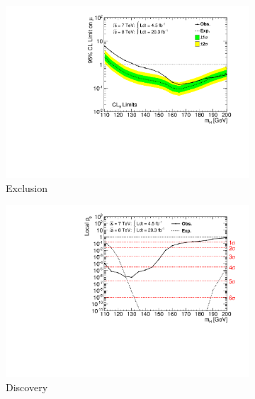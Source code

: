 \begin{figure}[p]
	\begin{subfigure}[b]{0.495\textwidth}
		\centering
		\includegraphics[width=\textwidth,clip=true,trim=0.6cm 0.8cm 1.0cm 0.4cm]{custom_images/limits/cls_ggf_only}
		\caption{Exclusion}
		\label{fig:ggf_results:CLs}
	\end{subfigure}
	\hfill
	\begin{subfigure}[b]{0.495\textwidth}
		\centering
		\includegraphics[width=\textwidth,clip=true,trim=0.6cm 0.8cm 1.0cm 0.4cm]{custom_images/limits/p0_ggf_only}
		\caption{Discovery}
		\label{fig:ggf_results:p0}
	\end{subfigure}
	\\[12pt]
	\begin{subfigure}[b]{0.495\textwidth}
		\centering

\end{subfigure}
\end{figure}
